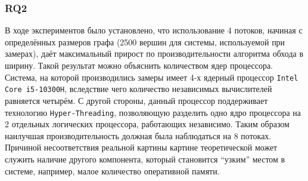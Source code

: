 \subsubsection{RQ2} В ходе экспериментов было установлено, что использование 4 потоков, начиная с определённых размеров графа (2500 вершин для системы, используемой при замерах), даёт максимальный прирост по производительности алгоритма обхода в ширину. Такой результат можно объяснить количеством ядер процессора. Система, на которой производились замеры имеет 4-х ядерный процессор \texttt{Intel Core i5-10300H}, вследствие чего количество независимых вычислителей равняется четырём. С другой стороны, данный процессор поддерживает технологию \texttt{Hyper-Threading}, позволяющую разделить одно ядро процессора на 2 отдельных логических процессора, работающих независимо. Таким образом наилучшая производительность должная была наблюдаться на 8 потоках. Причиной несоответствия реальной картины картине теоретической может служить наличие другого компонента, который становится \enquote{узким} местом в системе, например, малое количество оперативной памяти.
